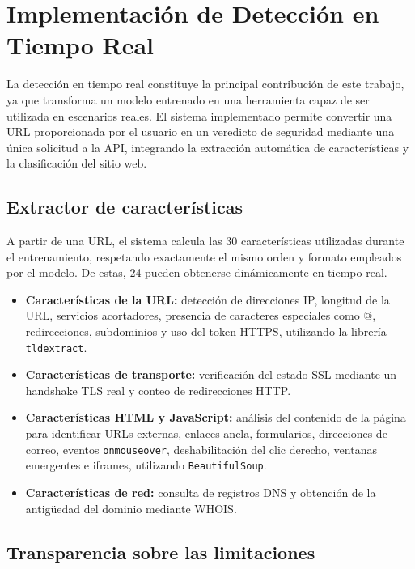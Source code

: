 \documentclass[conference]{IEEEtran}
\begin{document}
\section{Implementación de Detección en Tiempo Real}
La detección en tiempo real constituye la principal contribución de este trabajo, ya que transforma un modelo entrenado en una herramienta capaz de ser utilizada en escenarios reales. El sistema implementado permite convertir una URL proporcionada por el usuario en un veredicto de seguridad mediante una única solicitud a la API, integrando la extracción automática de características y la clasificación del sitio web.

\subsection{Extractor de características}

A partir de una URL, el sistema calcula las 30 características utilizadas durante el entrenamiento, respetando exactamente el mismo orden y formato empleados por el modelo. De estas, 24 pueden obtenerse dinámicamente en tiempo real.

\begin{itemize}
  \item \textbf{Características de la URL:} detección de direcciones IP, longitud de la URL, servicios acortadores, presencia de caracteres especiales como @, redirecciones, subdominios y uso del token HTTPS, utilizando la librería \texttt{tldextract}.
  
  \item \textbf{Características de transporte:} verificación del estado SSL mediante un handshake TLS real y conteo de redirecciones HTTP.
  
  \item \textbf{Características HTML y JavaScript:} análisis del contenido de la página para identificar URLs externas, enlaces ancla, formularios, direcciones de correo, eventos \texttt{onmouseover}, deshabilitación del clic derecho, ventanas emergentes e iframes, utilizando \texttt{BeautifulSoup}.
  
  \item \textbf{Características de red:} consulta de registros DNS y obtención de la antigüedad del dominio mediante WHOIS.
\end{itemize}

\subsection{Transparencia sobre las limitaciones}
\end{document}

